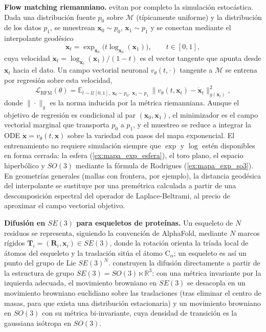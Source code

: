 \textbf{Flow matching riemanniano.} \citet{chen2024flowmatchinggeometries} evitan por completo la simulación estocástica. Dada una distribución fuente $p_0$ sobre $\mathcal{M}$ (típicamente uniforme) y la distribución de los datos $p_1$, se muestrean $\mathbf{x}_0 \sim p_0$, $\mathbf{x}_1 \sim p_1$ y se conectan mediante el interpolante geodésico
\begin{equation}
    \mathbf{x}_t = \exp_{\mathbf{x}_0}\!\big(t \log_{\mathbf{x}_0}(\mathbf{x}_1)\big), \qquad t \in [0, 1],
\end{equation}
cuya velocidad $\dot{\mathbf{x}}_t = \log_{\mathbf{x}_t}(\mathbf{x}_1)/(1 - t)$ es el vector tangente que apunta desde $\mathbf{x}_t$ hacia el dato. Un campo vectorial neuronal $v_\theta(t, \cdot)$ tangente a $\mathcal{M}$ se entrena por regresión sobre esta velocidad,
\begin{equation}\label{eq:riemannian_flow_matching}
    \mathcal{L}_{\text{RFM}}(\theta) = \mathbb{E}_{t \sim \mathcal{U}[0,1],\; \mathbf{x}_0 \sim p_0,\; \mathbf{x}_1 \sim p_1}\, \big\| v_\theta(t, \mathbf{x}_t) - \dot{\mathbf{x}}_t \big\|^2_{g(\mathbf{x}_t)},
\end{equation}
donde $\|\cdot\|_{g}$ es la norma inducida por la métrica riemanniana. Aunque el objetivo de regresión es condicional al par $(\mathbf{x}_0, \mathbf{x}_1)$, el minimizador es el campo vectorial marginal que transporta $p_0$ a $p_1$, y el muestreo se reduce a integrar la ODE $\dot{\mathbf{x}} = v_\theta(t, \mathbf{x})$ sobre la variedad con pasos del mapa exponencial. El entrenamiento no requiere simulación siempre que $\exp$ y $\log$ estén disponibles en forma cerrada: la esfera (\autoref{ex:mapa_exp_esfera}), el toro plano, el espacio hiperbólico y $SO(3)$ mediante la fórmula de Rodrigues (\autoref{ex:mapa_exp_so3}). En geometrías generales (mallas con frontera, por ejemplo), la distancia geodésica del interpolante se sustituye por una premétrica calculada a partir de una descomposición espectral del operador de Laplace-Beltrami, al precio de aproximar el campo vectorial objetivo.

\textbf{Difusión en $SE(3)$ para esqueletos de proteínas.} Un esqueleto de $N$ residuos se representa, siguiendo la convención de AlphaFold, mediante $N$ marcos rígidos $\mathbf{T}_i = (\mathbf{R}_i, \mathbf{x}_i) \in SE(3)$, donde la rotación orienta la tríada local de átomos del esqueleto y la traslación sitúa el átomo $\text{C}_\alpha$; un esqueleto es así un punto del grupo de Lie $SE(3)^N$. \citet{yim2023se3diffusion} construyen la difusión directamente a partir de la estructura de grupo $SE(3) = SO(3) \ltimes \mathbb{R}^3$: con una métrica invariante por la izquierda adecuada, el movimiento browniano en $SE(3)$ se desacopla en un movimiento browniano euclidiano sobre las traslaciones (tras eliminar el centro de masas, para que exista una distribución estacionaria) y un movimiento browniano en $SO(3)$ con su métrica bi-invariante, cuya densidad de transición es la gaussiana isótropa en $SO(3)$.

